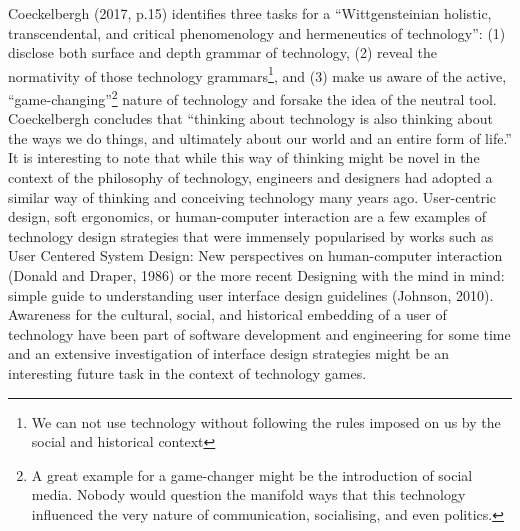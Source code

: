 Coeckelbergh (2017, p.15) identifies three tasks for a “Wittgensteinian holistic, transcendental, and critical phenomenology and hermeneutics of
technology”: (1) disclose both surface and depth grammar of technology, (2) reveal the normativity of those technology
grammars\footnote{We can not use technology without following the rules imposed on us by the social and historical context}, and (3) make us
aware of the active, “game-changing”\footnote{A great example for a game-changer might be the introduction of social media. Nobody
would question the manifold ways that this technology influenced the very nature of communication, socialising, and even politics.} nature
of technology and forsake the idea of the neutral tool. Coeckelbergh concludes that “thinking about technology is also thinking about the
ways we do things, and ultimately about our world and an entire form of life.” It is interesting to note that while this way of thinking might
be novel in the context of the philosophy of technology, engineers and designers had adopted a similar way of thinking and conceiving
technology many years ago. User-centric design, soft ergonomics, or human-computer interaction are a few examples of technology design
strategies that were immensely popularised by works such as User Centered System Design: New perspectives on human-computer interaction
(Donald and Draper, 1986) or the more recent Designing with the mind in mind: simple guide to understanding user interface design
guidelines (Johnson, 2010). Awareness for the cultural, social, and historical embedding of a user of technology have been part of software
development and engineering for some time and an extensive investigation of interface design strategies might be an interesting future task in
the context of technology games.